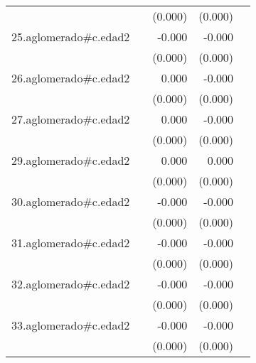{\begin{longtable}{l*{4}{D{.}{.}{-1}}}
            &                     &     (0.000)         &     (0.000)         &                     \\
\addlinespace
25.aglomerado#c.edad2&                     &      -0.000         &      -0.000\sym{*}  &                     \\
            &                     &     (0.000)         &     (0.000)         &                     \\
\addlinespace
26.aglomerado#c.edad2&                     &       0.000         &      -0.000         &                     \\
            &                     &     (0.000)         &     (0.000)         &                     \\
\addlinespace
27.aglomerado#c.edad2&                     &       0.000         &      -0.000         &                     \\
            &                     &     (0.000)         &     (0.000)         &                     \\
\addlinespace
29.aglomerado#c.edad2&                     &       0.000\sym{*}  &       0.000         &                     \\
            &                     &     (0.000)         &     (0.000)         &                     \\
\addlinespace
30.aglomerado#c.edad2&                     &      -0.000         &      -0.000         &                     \\
            &                     &     (0.000)         &     (0.000)         &                     \\
\addlinespace
31.aglomerado#c.edad2&                     &      -0.000         &      -0.000\sym{***}&                     \\
            &                     &     (0.000)         &     (0.000)         &                     \\
\addlinespace
32.aglomerado#c.edad2&                     &      -0.000         &      -0.000\sym{***}&                     \\
            &                     &     (0.000)         &     (0.000)         &                     \\
\addlinespace
33.aglomerado#c.edad2&                     &      -0.000         &      -0.000\sym{***}&                     \\
            &                     &     (0.000)         &     (0.000)         &                     \\

\end{longtable}}
